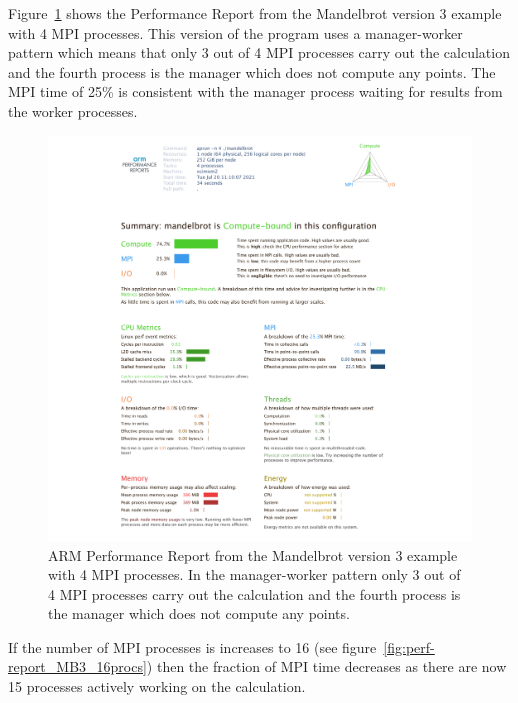 \documentclass[a4paper,titlepage]{article}
\begin{document}
Figure~\ref{fig:perf-report_MB3} shows the Performance Report from the Mandelbrot version 3 example with 4 MPI processes. This version of the program uses a manager-worker pattern which means that only 3 out of 4 MPI processes carry out the calculation and the fourth process is the manager which does not compute any points. The MPI time of 25\% is consistent with the manager process waiting for results from the worker processes. 
\begin{figure}[htbp]
\begin{center}
\includegraphics[scale=0.35]{figures/mandelbrot_v3_PerformanceReport}
\caption{ARM Performance Report from the Mandelbrot version 3 example with 4 MPI processes. In the manager-worker pattern only 3 out of 4 MPI processes carry out the calculation and the fourth process is the manager which does not compute any points.}
\label{fig:perf-report_MB3}
\end{center}
\end{figure}
If the number of MPI processes is increases to 16 (see figure~\ref{fig:perf-report_MB3_16procs}) then the fraction of MPI time decreases as there are now 15 processes actively working on the calculation.
\end{document}
